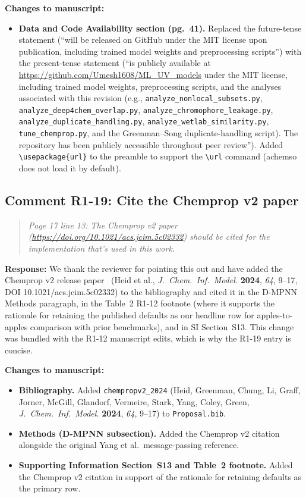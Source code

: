 \documentclass[11pt]{article}
\newenvironment{reviewer}{%
  \begin{quote}\itshape\color{black!70}}{%
  \end{quote}}
\newcommand{\response}[1]{\noindent\textbf{Response:} #1\par\medskip}
\newenvironment{changes}{%
  \noindent\textbf{Changes to manuscript:}
  \begin{itemize}[leftmargin=2em,itemsep=2pt]}{%
  \end{itemize}\medskip}
\begin{document}
\begin{changes}
  \item \textbf{Data and Code Availability section (pg.\ 41).} Replaced the future-tense statement (``will be released on GitHub under the MIT license upon publication, including trained model weights and preprocessing scripts'') with the present-tense statement (``is publicly available at \url{https://github.com/Umesh1608/ML_UV_models} under the MIT license, including trained model weights, preprocessing scripts, and the analyses associated with this revision (e.g., \texttt{analyze\_nonlocal\_subsets.py}, \texttt{analyze\_deep4chem\_overlap.py}, \texttt{analyze\_chromophore\_leakage.py}, \texttt{analyze\_duplicate\_handling.py}, \texttt{analyze\_wetlab\_similarity.py}, \texttt{tune\_chemprop.py}, and the Greenman--Song duplicate-handling script). The repository has been publicly accessible throughout peer review''). Added \texttt{\textbackslash usepackage\{url\}} to the preamble to support the \texttt{\textbackslash url} command (achemso does not load it by default).
\end{changes}

\subsection*{Comment R1-19: Cite the Chemprop v2 paper}
\begin{reviewer}
Page 17 line 13: The Chemprop v2 paper (\url{https://doi.org/10.1021/acs.jcim.5c02332}) should be cited for the implementation that's used in this work.
\end{reviewer}

\response{We thank the reviewer for pointing this out and have added the Chemprop v2 release paper~\cite{chempropv2_2024} (Heid et al., \textit{J.\ Chem.\ Inf.\ Model.} \textbf{2024}, \textit{64}, 9--17, DOI 10.1021/acs.jcim.5c02332) to the bibliography and cited it in the D-MPNN Methods paragraph, in the Table~2 R1-12 footnote (where it supports the rationale for retaining the published defaults as our headline row for apples-to-apples comparison with prior benchmarks), and in SI Section~S13. This change was bundled with the R1-12 manuscript edits, which is why the R1-19 entry is concise.}

\begin{changes}
  \item \textbf{Bibliography.} Added \texttt{chempropv2\_2024} (Heid, Greenman, Chung, Li, Graff, Jorner, McGill, Glandorf, Vermeire, Stark, Yang, Coley, Green, \textit{J.\ Chem.\ Inf.\ Model.} \textbf{2024}, \textit{64}, 9--17) to \texttt{Proposal.bib}.
  \item \textbf{Methods (D-MPNN subsection).} Added the Chemprop v2 citation alongside the original Yang et al.\ message-passing reference.
  \item \textbf{Supporting Information Section~S13 and Table~2 footnote.} Added the Chemprop v2 citation in support of the rationale for retaining defaults as the primary row.
\end{changes}
\end{document}
